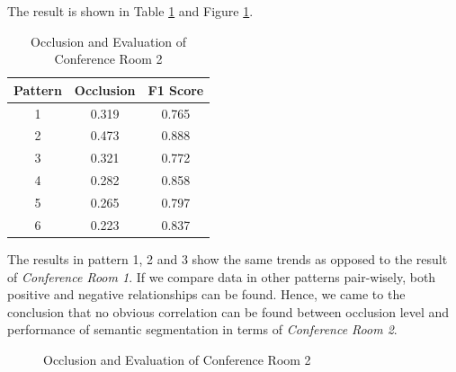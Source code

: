 \documentclass[11pt, a4paper,oneside,chapterprefix=false]{scrbook}
\begin{document}
The result is shown in Table \ref{tab:evaluation metrics of conference room 2} and Figure \ref{fig:evaluation metrics of conference room 2}.

\begin{table}[H]
    \centering
    \begin{tabular}{|c|c|c|}
        \hline
        Pattern & Occlusion & F1 Score \\
        \hline
        1 & 0.319 & 0.765 \\
        2 & 0.473 & 0.888 \\
        3 & 0.321 & 0.772 \\
        4 & 0.282 & 0.858 \\
        5 & 0.265 & 0.797 \\
        6 & 0.223 & 0.837 \\
        \hline
    \end{tabular}
    \caption{Occlusion and Evaluation of Conference Room 2}
    \label{tab:evaluation metrics of conference room 2}
\end{table}

The results in pattern 1, 2 and 3 show the same trends as opposed to the result of \emph{Conference Room 1}. If we compare data in other patterns pair-wisely,  both positive and negative relationships can be found. Hence, we came to the conclusion that no obvious correlation can be found between occlusion level and performance of semantic segmentation in terms of \emph{Conference Room 2}.

\begin{figure}[H]
    \centering
    \caption{Occlusion and Evaluation of Conference Room 2}
    \label{fig:evaluation metrics of conference room 2}
\end{figure}
\end{document}
